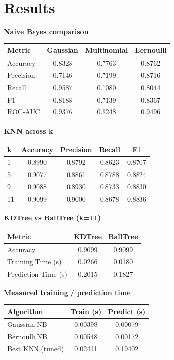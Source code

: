 \documentclass[12pt,a4paper]{article}
\begin{document}
\section{Results}

\textbf{Naive Bayes comparison}

\begin{tabular}{lccc}
\toprule
Metric & Gaussian & Multinomial & Bernoulli \\
\midrule
Accuracy & 0.8328 & 0.7763 & 0.8762 \\
Precision & 0.7146 & 0.7199 & 0.8716 \\
Recall & 0.9587 & 0.7080 & 0.8044 \\
F1 & 0.8188 & 0.7139 & 0.8367 \\
ROC-AUC & 0.9376 & 0.8248 & 0.9496 \\
\bottomrule
\end{tabular}

\vspace{0.3cm}
\textbf{KNN across k}

\begin{tabular}{lcccc}
\toprule
k & Accuracy & Precision & Recall & F1 \\
\midrule
1 & 0.8990 & 0.8792 & 0.8623 & 0.8707 \\
5 & 0.9077 & 0.8861 & 0.8788 & 0.8824 \\
9 & 0.9088 & 0.8930 & 0.8733 & 0.8830 \\
11 & 0.9099 & 0.9000 & 0.8678 & 0.8836 \\
\bottomrule
\end{tabular}

\vspace{0.3cm}
\textbf{KDTree vs BallTree (k=11)}

\begin{tabular}{lcc}
\toprule
Metric & KDTree & BallTree \\
\midrule
Accuracy & 0.9099 & 0.9099 \\
Training Time (s) & 0.0266 & 0.0180 \\
Prediction Time (s) & 0.2015 & 0.1827 \\
\bottomrule
\end{tabular}

\vspace{0.3cm}
\textbf{Measured training / prediction time}

\begin{tabular}{lcc}
\toprule
Algorithm & Train (s) & Predict (s) \\
\midrule
Gaussian NB & 0.00398 & 0.00079 \\
Bernoulli NB & 0.00548 & 0.00172 \\
Best KNN (tuned) & 0.02411 & 0.19402 \\
\bottomrule
\end{tabular}
\end{document}
